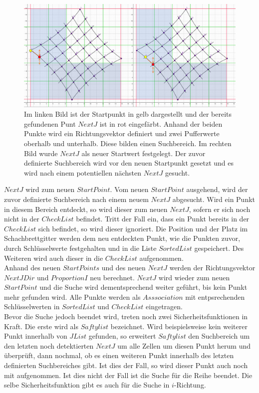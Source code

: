 \begin{figure}[!htb]
	\centering
	\includegraphics[width=1\linewidth]{images/VerzeichnetesSchachbrett_4.png}
	\caption[Suche nach $NextJ$]{Im linken Bild ist der Startpunkt in gelb dargestellt und der bereits gefundenen Punt $NextJ$ ist in rot eingefärbt. Anhand der beiden Punkte wird ein Richtungsvektor definiert und zwei Pufferwerte oberhalb und unterhalb. Diese bilden einen Suchbereich. Im rechten Bild wurde $NextJ$ als neuer Startwert festgelegt. Der zuvor definierte Suchbereich wird vor den neuen Startpunkt gesetzt und es wird nach einem potentiellen nächsten $NextJ$ gesucht.}
	\label{fig:IListJList}
\end{figure}

$NextJ$ wird zum neuen $StartPoint$. Vom neuen $StartPoint$ ausgehend, wird der zuvor definierte Suchbereich nach einem neuem $NextJ$ abgesucht. Wird ein Punkt in diesem Bereich entdeckt, so wird dieser zum neuen $NextJ$, sofern er sich noch nicht in der $CheckList$ befindet. Tritt der Fall ein, dass ein Punkt bereits in der $CheckList$ sich befindet, so wird dieser ignoriert. Die Position und der Platz im Schachbrettgitter werden dem neu entdeckten Punkt, wie die Punkten zuvor, durch Schlüsselwerte festgehalten und in die Liste $SortedList$ gespeichert. Des Weiteren wird auch dieser in die $CheckList$ aufgenommen.\\

Anhand des neuen $StartPoints$ und des neuen $NextJ$ werden der Richtungsvektor $NextJDir$ und $ProportionI$ neu berechnet. $NextJ$ wird wieder zum neuen $StartPoint$ und die Suche wird dementsprechend weiter geführt, bis kein Punkt mehr gefunden wird. Alle Punkte werden als $Asssociation$ mit entpsrechenden Schlüsselwerten in $SortedList$ und $CheckList$ eingetragen.\\

Bevor die Suche jedoch beendet wird, treten noch zwei Sicherheitsfunktionen in Kraft. Die erste wird als $Saftylist$ bezeichnet. Wird beispielsweise kein weiterer Punkt innerhalb von $JList$ gefunden, so erweitert $Saftylist$ den Suchbereich um den letzten noch detektierten $NextJ$ um alle Zellen um diesen Punkt herum und überprüft, dann nochmal, ob es einen weiteren Punkt innerhalb des letzten definierten Suchbereiches gibt. Ist dies der Fall, so wird dieser Punkt auch noch mit aufgenommen. Ist dies nicht der Fall ist die Suche für die Reihe beendet. Die selbe Sicherheitsfunktion gibt es auch für die Suche in $i$-Richtung.\\

